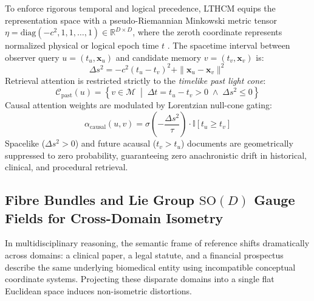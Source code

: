 \documentclass[11pt,a4paper]{article}
\begin{document}
To enforce rigorous temporal and logical precedence, LTHCM equips the representation space with a pseudo-Riemannian Minkowski metric tensor $\eta = \mathrm{diag}(-c^2, 1, 1, \dots, 1) \in \mathbb{R}^{D \times D}$, where the zeroth coordinate represents normalized physical or logical epoch time $t$ \cite{clough2020lorentzian}. The spacetime interval between observer query $u = (t_u, \mathbf{x}_u)$ and candidate memory $v = (t_v, \mathbf{x}_v)$ is:
\begin{equation}
    \Delta s^2 = -c^2 (t_u - t_v)^2 + \|\mathbf{x}_u - \mathbf{x}_v\|^2
\end{equation}
Retrieval attention is restricted strictly to the \emph{timelike past light cone}:
\begin{equation}
    \mathcal{C}_{\mathrm{past}}(u) = \left\{ v \in \mathcal{M} \;\middle|\; \Delta t = t_u - t_v > 0 \;\land\; \Delta s^2 \le 0 \right\}
\end{equation}
Causal attention weights are modulated by Lorentzian null-cone gating:
\begin{equation}
    \alpha_{\mathrm{causal}}(u, v) = \sigma\left( -\frac{\Delta s^2}{\tau} \right) \cdot \mathbb{I}\left[ t_u \ge t_v \right]
\end{equation}
Spacelike ($\Delta s^2 > 0$) and future acausal ($t_v > t_u$) documents are geometrically suppressed to zero probability, guaranteeing zero anachronistic drift in historical, clinical, and procedural retrieval.

\subsection{Fibre Bundles and Lie Group $\mathrm{SO}(D)$ Gauge Fields for Cross-Domain Isometry}

In multidisciplinary reasoning, the semantic frame of reference shifts dramatically across domains: a clinical paper, a legal statute, and a financial prospectus describe the same underlying biomedical entity using incompatible conceptual coordinate systems. Projecting these disparate domains into a single flat Euclidean space induces non-isometric distortions.
\end{document}
